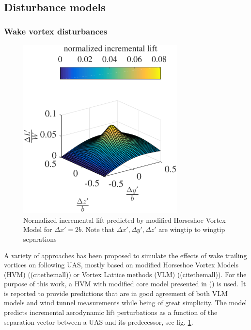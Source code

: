 \documentclass{ifacconf}
\begin{document}
\subsection{Disturbance models}

\subsubsection{Wake vortex disturbances}

\begin{figure}
\begin{center}
\includegraphics[width=8.4cm]{incrementallift}    %
\caption{Normalized incremental lift predicted by modified Horseshoe Vortex Model for $\Delta x' = 2b$. Note that $\Delta x', \Delta y', \Delta z'$ are wingtip to wingtip separations} 
\label{fig:HSVMincrementalift}
\end{center}
\end{figure}

A variety of approaches has been proposed to simulate the effects of wake trailing vortices on following UAS, mostly based on modified Horseshoe Vortex Models (HVM) ((citethemall)) or Vortex Lattice methods (VLM) ((citethemall)). For the purpose of this work, a HVM with modified core model presented in (\cite{dogan2005modeling}) is used. It is reported to provide predictions that are in good agreement of both VLM models and wind tunnel measurements while being of great simplicity. The model predicts incremental aerodynamic lift perturbations as a function of the separation vector between a UAS and its predecessor, see fig. \ref{fig:HSVMincrementalift}. 
\end{document}
